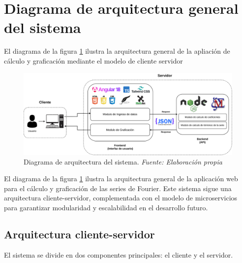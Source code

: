 \section{Diagrama de arquitectura general del sistema}
El diagrama de  la figura \ref{fig:diagrama_arqui} ilustra la arquitectura general de la apliación de cálculo y graficación mediante el modelo de cliente servidor
\begin{figure}[H]
	\centering
	\includegraphics[width=1\textwidth]{img/chapter04/Arquitectura-Sistema-TT.drawio.pdf}
	\caption[Diagrama de arquitectura del sistema.]{Diagrama de arquitectura del sistema. \textit{Fuente: \textit{Elaboración propia}}}
	\label{fig:diagrama_arqui}  %
\end{figure}
El diagrama de la figura \ref{fig:diagrama_arqui} ilustra la arquitectura general de la aplicación web para el cálculo y graficación de las series de Fourier. Este sistema sigue una arquitectura cliente-servidor, complementada con el modelo de microservicios para garantizar modularidad y escalabilidad en el desarrollo futuro.
\subsection{Arquitectura cliente-servidor}
El sistema se divide en dos componentes principales: el cliente y el servidor.

